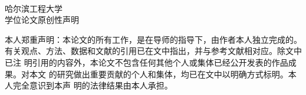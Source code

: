 {\begin{titlepage}
\begin{center}
    \parbox[t][3.0cm][b]{\textwidth}{\erhao
    \begin{center} {  \@etitle}\end{center} }

    \parbox[t][4.0cm][t]{\textwidth}{
    \begin{center}  \end{center} }

    \parbox[t][6cm][c]{\textwidth}{ {\sihao
    \begin{center} \renewcommand{\arraystretch}{1.5}
    	\parbox[t][1.0cm][t]{\textwidth}{
    		\sihao
    		\makebox[3.6cm][c]{}
    		\makebox[7em][l]{\song \@eauthor}
    	}
    	\parbox[t][1.0cm][t]{\textwidth}{
    		\sihao
    		\makebox[3.6cm][c]{}
    		\makebox[7em][l]{\song \@esupervisor}
    	}
    	\parbox[t][1.0cm][t]{\textwidth}{
    		\sihao
    		\makebox[3.6cm][c]{}
    		\makebox[7em][l]{\song \@edegree}
    	}
    	\parbox[t][1.0cm][t]{\textwidth}{
    		\sihao
    		\makebox[3.6cm][c]{}
    		\makebox[7em][l]{\song \@esubject}
    	}
    	\parbox[t][1.0cm][t]{\textwidth}{
    		\sihao
    		\makebox[3.6cm][c]{}
    		\makebox[7em][l]{\song \@edate}
    	}
    	\parbox[t][1.0cm][t]{\textwidth}{
    		\sihao
    		\makebox[3.6cm][c]{}
    		\makebox[7em][l]{\song \@edate}
    	}
    	\parbox[t][1.0cm][t]{\textwidth}{
    		\sihao
    		\makebox[3.6cm][c]{}
    	}
    \end{center}}}

    \end{center}
    
    \ifoneortwoside
    \newpage
    ~~~\vspace{1em}
    \thispagestyle{empty}
    \fi
    \newpage
    \thispagestyle{empty}
    \begin{center}
    	\heiti  \xiaosan 哈尔滨工程大学\\学位论文原创性声明
    \end{center}
    
    \fontsize{12pt}{23pt}\selectfont
    本人郑重声明：本论文的所有工作，是在导师的指导下，由作者本人独立完成的。
    有关观点、方法、数据和文献的引用已在文中指出，并与参考文献相对应。除文中已注
    明引用的内容外，本论文不包含任何其他个人或集体已经公开发表的作品成果。对本文
    的研究做出重要贡献的个人和集体，均已在文中以明确方式标明。本人完全意识到本声
    明的法律结果由本人承担。\\
    

\end{titlepage}}
